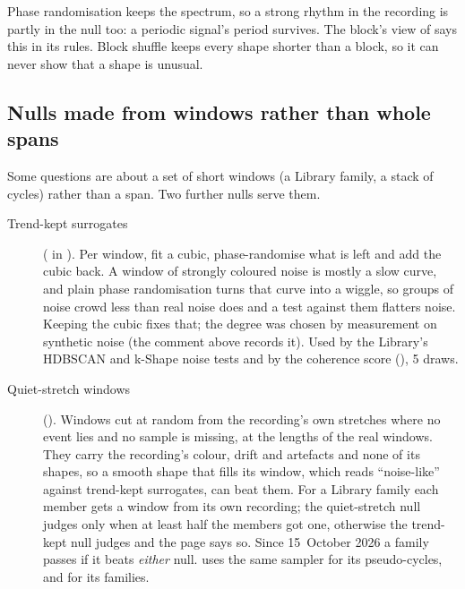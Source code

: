 \begin{watchout}
Phase randomisation keeps the spectrum, so a strong rhythm in the recording is partly in the
null too: a periodic signal's period survives. The block's view of
 says this in its rules. Block shuffle keeps every
shape shorter than a block, so it can never show that a shape is unusual.
\end{watchout}

\subsection{Nulls made from windows rather than whole spans}
Some questions are about a set of short windows (a Library family, a stack of cycles) rather
than a span. Two further nulls serve them.
\begin{description}
\item[Trend-kept surrogates] ( in
  ). Per window, fit a cubic, phase-randomise
  what is left and add the cubic back. A window of strongly coloured noise is mostly a slow
  curve, and plain phase randomisation turns that curve into a wiggle, so groups of noise
  crowd less than real noise does and a test against them flatters noise. Keeping the cubic
  fixes that; the degree was chosen by measurement on synthetic noise (the comment above
   records it). Used by the Library's HDBSCAN and k-Shape noise tests and by
  the coherence score (), 5 draws.
\item[Quiet-stretch windows] (). Windows cut at random from
  the recording's own stretches where no event lies and no sample is missing, at the lengths
  of the real windows. They carry the recording's colour, drift and artefacts and none of its
  shapes, so a smooth shape that fills its window, which reads ``noise-like'' against
  trend-kept surrogates, can beat them. For a Library family each member gets a window from
  its own recording; the quiet-stretch null judges only when at least half the members got
  one, otherwise the trend-kept null judges and the page says so. Since 15~October 2026 a
  family passes if it beats \emph{either} null.  uses the
  same sampler for its pseudo-cycles, and  for its
  families.
\end{description}

